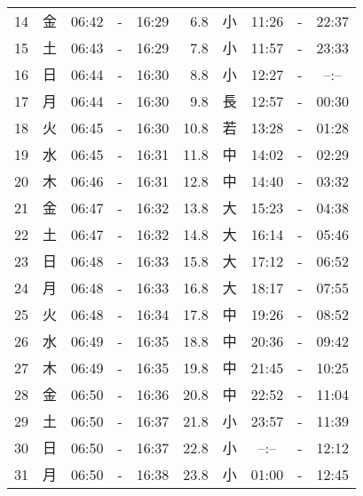 \documentclass[a4j,10pt]{jsarticle}
\begin{document}
\begin{center}
\begin{table}[ht]
\begin{center}
\begin{tabular}{|rc|ccc|rc|ccc|}
 14 & 金 & 06:42 &-& 16:29 &  6.8 & 小 & 11:26 &-& 22:37 \\
 15 & 土 & 06:43 &-& 16:29 &  7.8 & 小 & 11:57 &-& 23:33 \\
 16 & 日 & 06:44 &-& 16:30 &  8.8 & 小 & 12:27 &-& --:-- \\
 17 & 月 & 06:44 &-& 16:30 &  9.8 & 長 & 12:57 &-& 00:30 \\
 18 & 火 & 06:45 &-& 16:30 & 10.8 & 若 & 13:28 &-& 01:28 \\
 19 & 水 & 06:45 &-& 16:31 & 11.8 & 中 & 14:02 &-& 02:29 \\
 20 & 木 & 06:46 &-& 16:31 & 12.8 & 中 & 14:40 &-& 03:32 \\
 21 & 金 & 06:47 &-& 16:32 & 13.8 & 大 & 15:23 &-& 04:38 \\
 22 & 土 & 06:47 &-& 16:32 & 14.8 & 大 & 16:14 &-& 05:46 \\
 23 & 日 & 06:48 &-& 16:33 & 15.8 & 大 & 17:12 &-& 06:52 \\
 24 & 月 & 06:48 &-& 16:33 & 16.8 & 大 & 18:17 &-& 07:55 \\
 25 & 火 & 06:48 &-& 16:34 & 17.8 & 中 & 19:26 &-& 08:52 \\
 26 & 水 & 06:49 &-& 16:35 & 18.8 & 中 & 20:36 &-& 09:42 \\
 27 & 木 & 06:49 &-& 16:35 & 19.8 & 中 & 21:45 &-& 10:25 \\
 28 & 金 & 06:50 &-& 16:36 & 20.8 & 中 & 22:52 &-& 11:04 \\
 29 & 土 & 06:50 &-& 16:37 & 21.8 & 小 & 23:57 &-& 11:39 \\
 30 & 日 & 06:50 &-& 16:37 & 22.8 & 小 & --:-- &-& 12:12 \\
 31 & 月 & 06:50 &-& 16:38 & 23.8 & 小 & 01:00 &-& 12:45 \\
\hline
\end{tabular}
\end{center}
\end{table}
\newpage
\end{center}
\end{document}

